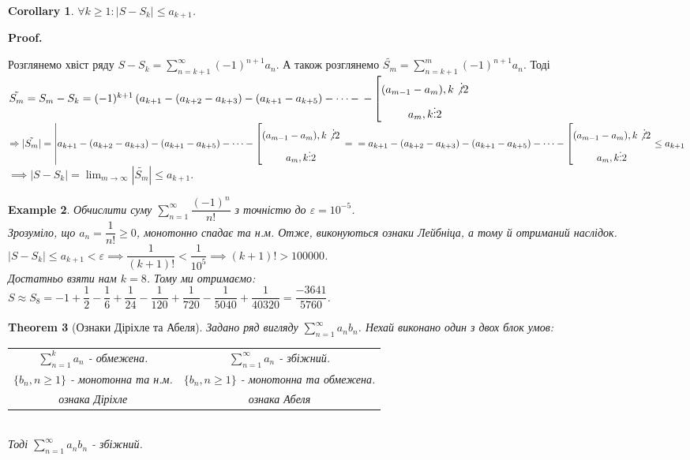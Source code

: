 \documentclass[a4paper, 10pt]{article}
\makeatletter
\def\huge{\displaystyle}
\def\qed{$\blacksquare$}
\theoremstyle{theoremdd}
\newtheorem{theorem}{Theorem}[subsection]
\theoremstyle{theoremdd}
\theoremstyle{theoremdd}
\theoremstyle{theoremdd}
\theoremstyle{theoremdd}
\newtheorem{example}[theorem]{Example}
\theoremstyle{theoremdd}
\theoremstyle{theoremdd}
\theoremstyle{theoremdd}
\theoremstyle{theoremdd}
\newtheorem{corollary}[theorem]{Corollary}
\renewenvironment{proof}[1][Proof.\\]{\par
\pushQED{\hfill \qed}%
\normalfont \topsep6\p@\@plus6\p@\relax
\trivlist
\item\relax
{\bfseries
#1\@addpunct{.}}\hspace\labelsep\ignorespaces
}{%
\popQED\endtrivlist\@endpefalse
}
\makeatother
\begin{document}
\begin{corollary}
$\forall k \geq 1: |S-S_k| \leq a_{k+1}$.
\end{corollary}

\begin{proof}
Розглянемо хвіст ряду $S-S_k = \huge \sum_{n=k+1}^{\infty} (-1)^{n+1}a_n$. А також розглянемо $\tilde{S_m} = \huge \sum_{n=k+1}^{m} (-1)^{n+1}a_n$. Тоді\\
$\tilde{S_m} = S_m - S_k = (-1)^{k+1} \left(a_{k+1}-(a_{k+2}-a_{k+3})-(a_{k+1}-a_{k+5}) - \dots - \right. \left. - \left[ \begin{gathered} (a_{m-1}-a_m), k \not \vdots 2 \\ a_m, k \vdots 2 \end{gathered} \right. \right.$\\
$\Rightarrow |\tilde{S_m}| = \left|a_{k+1}-(a_{k+2}-a_{k+3})-(a_{k+1}-a_{k+5}) - \dots - \left[ \begin{gathered} (a_{m-1}-a_m), k \not \vdots 2 \\ a_m, k \vdots 2 \end{gathered} \right. \right. = \\
= a_{k+1}-(a_{k+2}-a_{k+3})-(a_{k+1}-a_{k+5}) - \dots - \left[ \begin{gathered} (a_{m-1}-a_m), k \not \vdots 2 \\ a_m, k \vdots 2 \end{gathered} \right. \leq a_{k+1}$\\
$\implies |S - S_k| = \huge \lim_{m \to \infty} |\tilde{S_m}| \leq a_{k+1}$. \end{proof}

\begin{example}
Обчислити суму $\huge\sum_{n=1}^\infty \dfrac{(-1)^n}{n!}$ з точністю до $\varepsilon = 10^{-5}$.\\
Зрозуміло, що $a_n = \dfrac{1}{n!} \geq 0$, монотонно спадає та н.м. Отже, виконуються ознаки Лейбніца, а тому й отриманий наслідок.\\
$|S-S_k| \leq a_{k+1} < \varepsilon \implies \dfrac{1}{(k+1)!} < \dfrac{1}{10^5} \implies (k+1)! > 100000$.\\
Достатньо взяти нам $k = 8$. Тому ми отримаємо:\\
$S \approx S_8 = -1 + \dfrac{1}{2} - \dfrac{1}{6} + \dfrac{1}{24} - \dfrac{1}{120} + \dfrac{1}{720} - \dfrac{1}{5040} + \dfrac{1}{40320} = \dfrac{-3641}{5760}$.
\end{example}

\begin{theorem}[Ознаки Діріхле та Абеля]
Задано ряд вигляду $\huge \sum_{n=1}^{\infty} a_n b_n$. Нехай виконано один з двох блок умов:\\
\begin{tabular}{c | c}
$\huge\sum_{n=1}^k a_n$ - обмежена. & $\huge \sum_{n=1}^{\infty} a_n$ - збіжний. \\
$\{b_n, n \geq 1\}$ - монотонна та н.м. & $\{b_n, n \geq 1\}$ - монотонна та обмежена.\\
\textit{ознака Діріхле} & \textit{ознака Абеля}
\end{tabular} \\
Тоді $\huge \sum_{n=1}^{\infty} a_n b_n$ - збіжний.
\end{theorem}
\end{document}
